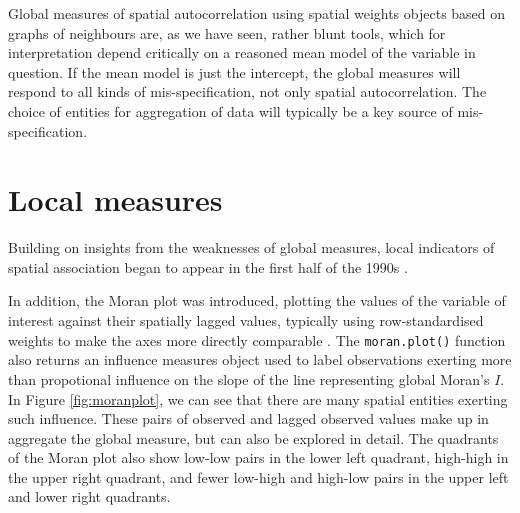 \documentclass[]{book}
\newenvironment{Shaded}{\begin{snugshade}}{\end{snugshade}}
\newcommand{\DataTypeTok}[1]{\textcolor[rgb]{0.13,0.29,0.53}{#1}}
\newcommand{\DecValTok}[1]{\textcolor[rgb]{0.00,0.00,0.81}{#1}}
\newcommand{\KeywordTok}[1]{\textcolor[rgb]{0.13,0.29,0.53}{\textbf{#1}}}
\newcommand{\NormalTok}[1]{#1}
\newcommand{\OperatorTok}[1]{\textcolor[rgb]{0.81,0.36,0.00}{\textbf{#1}}}
\newcommand{\StringTok}[1]{\textcolor[rgb]{0.31,0.60,0.02}{#1}}
\begin{document}
Global measures of spatial autocorrelation using spatial weights objects based on graphs of neighbours are, as we have seen, rather blunt tools, which for interpretation depend critically on a reasoned mean model of the variable in question. If the mean model is just the intercept, the global measures will respond to all kinds of mis-specification, not only spatial autocorrelation. The choice of entities for aggregation of data will typically be a key source of mis-specification.

\hypertarget{local-measures}{%
\section{Local measures}\label{local-measures}}

Building on insights from the weaknesses of global measures, local indicators of spatial association began to appear in the first half of the 1990s \citep{anselin:95, getis+ord:92, getis+ord:96}.

In addition, the Moran plot was introduced, plotting the values of the variable of interest against their spatially lagged values, typically using row-standardised weights to make the axes more directly comparable \citep{anselin:96}. The \texttt{moran.plot()} function also returns an influence measures object used to label observations exerting more than propotional influence on the slope of the line representing global Moran's \(I\). In Figure \ref{fig:moranplot}, we can see that there are many spatial entities exerting such influence. These pairs of observed and lagged observed values make up in aggregate the global measure, but can also be explored in detail. The quadrants of the Moran plot also show low-low pairs in the lower left quadrant, high-high in the upper right quadrant, and fewer low-high and high-low pairs in the upper left and lower right quadrants.



\begin{Shaded}
\end{Shaded}
\end{document}
